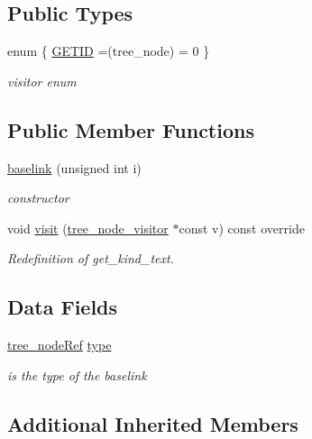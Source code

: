 \subsection*{Public Types}
\begin{DoxyCompactItemize}
\item 
enum \{ \hyperlink{structbaselink_a0373b0ef976520fa64c5b457b6e7e4cfac4e877b6bf52d8c0882f540524865811}{G\+E\+T\+ID} =(tree\+\_\+node) = 0
 \}\begin{DoxyCompactList}\small\item\em visitor enum \end{DoxyCompactList}
\end{DoxyCompactItemize}
\subsection*{Public Member Functions}
\begin{DoxyCompactItemize}
\item 
\hyperlink{structbaselink_ac6d84294a809f3b0f3ab9fb7e8f0e34a}{baselink} (unsigned int i)
\begin{DoxyCompactList}\small\item\em constructor \end{DoxyCompactList}\item 
void \hyperlink{structbaselink_a29dcaf2f07ad2369231426497d482ef0}{visit} (\hyperlink{classtree__node__visitor}{tree\+\_\+node\+\_\+visitor} $\ast$const v) const override
\begin{DoxyCompactList}\small\item\em Redefinition of get\+\_\+kind\+\_\+text. \end{DoxyCompactList}\end{DoxyCompactItemize}
\subsection*{Data Fields}
\begin{DoxyCompactItemize}
\item 
\hyperlink{tree__node_8hpp_a6ee377554d1c4871ad66a337eaa67fd5}{tree\+\_\+node\+Ref} \hyperlink{structbaselink_afbff8cb80e2e644f8a5fdaf4bcb8c46e}{type}
\begin{DoxyCompactList}\small\item\em is the type of the baselink \end{DoxyCompactList}\end{DoxyCompactItemize}
\subsection*{Additional Inherited Members}


